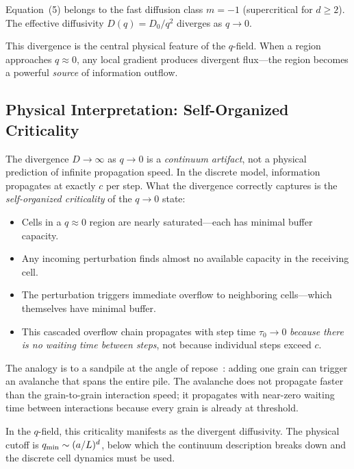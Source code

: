 \documentclass[reprint]{revtex4-2}
\begin{document}
\begin{theorem}
\label{thm:fastdiff}
Equation~(5) belongs to the fast diffusion class $m=-1$ (supercritical for $d\ge 2$). The effective diffusivity $D(q)=D_0/q^2$ diverges as $q\to 0$.
\end{theorem}

This divergence is the central physical feature of the $q$-field. When a region approaches $q\approx 0$, any local gradient produces divergent flux---the region becomes a powerful \emph{source} of information outflow.

\subsection{Physical Interpretation: Self-Organized Criticality}

The divergence $D\to\infty$ as $q\to 0$ is a \emph{continuum artifact}, not a physical prediction of infinite propagation speed. In the discrete model, information propagates at exactly $c$ per step. What the divergence correctly captures is the \emph{self-organized criticality} of the $q\to 0$ state:

\begin{itemize}
\item Cells in a $q\approx 0$ region are nearly saturated---each has minimal buffer capacity.
\item Any incoming perturbation finds almost no available capacity in the receiving cell.
\item The perturbation triggers immediate overflow to neighboring cells---which themselves have minimal buffer.
\item This cascaded overflow chain propagates with step time $\tau_0\to 0$ \emph{because there is no waiting time between steps}, not because individual steps exceed $c$.
\end{itemize}

The analogy is to a sandpile at the angle of repose~\cite{Bak1987}: adding one grain can trigger an avalanche that spans the entire pile. The avalanche does not propagate faster than the grain-to-grain interaction speed; it propagates with near-zero waiting time between interactions because every grain is already at threshold.

In the $q$-field, this criticality manifests as the divergent diffusivity. The physical cutoff is $q_{\rm min}\sim(a/L)^d$, below which the continuum description breaks down and the discrete cell dynamics must be used.
\end{document}
